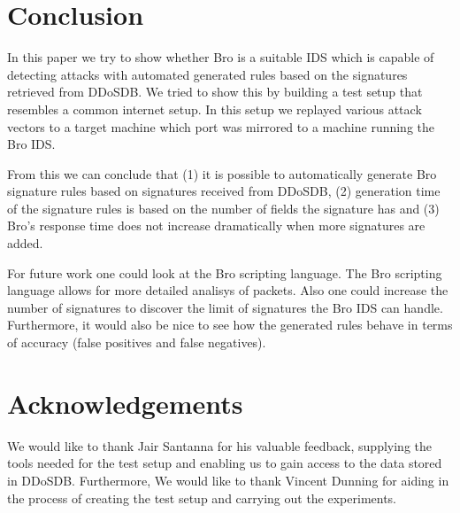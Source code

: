 \section{Conclusion}
\label{section:conclusion}
In this paper we try to show whether Bro is a suitable IDS which is capable of detecting attacks with automated generated rules based on the signatures retrieved from DDoSDB. We tried to show this by building a test setup that resembles a common internet setup. In this setup we replayed various attack vectors to a target machine which port was mirrored to a machine running the Bro IDS. 

From this we can conclude that (1) it is possible to automatically generate Bro signature rules based on signatures received from DDoSDB, (2) generation time of the signature rules is based on the number of fields the signature has and (3) Bro's response time does not increase dramatically when more signatures are added. 

For future work one could look at the Bro scripting language. The Bro scripting language allows for more detailed analisys of packets. Also one could increase the number of signatures to discover the limit of signatures the Bro IDS can handle. Furthermore, it would also be nice to see how the generated rules behave in terms of accuracy (false positives and false negatives). 

\section{Acknowledgements}
We would like to thank Jair Santanna for his valuable feedback, supplying the tools needed for the test setup and enabling us to gain access to the data stored in DDoSDB. Furthermore, We would like to thank Vincent Dunning for aiding in the process of creating the test setup and carrying out the experiments.  